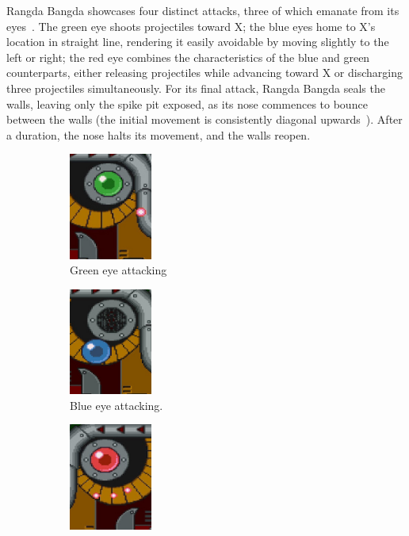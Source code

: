 Rangda Bangda showcases four distinct attacks, three of which emanate from its eyes~\cite{wiki:Rangda_bangda}. The green eye shoots projectiles toward X; the blue eyes home to X's location in straight line, rendering it easily avoidable by moving slightly to the left or right; the red eye combines the characteristics of the blue and green counterparts, either releasing projectiles while advancing toward X or discharging three projectiles simultaneously. For its final attack, Rangda Bangda seals the walls, leaving only the spike pit exposed, as its nose commences to bounce between the walls (the initial movement is consistently diagonal upwards~\cite{stratwiki:Sigma_stage_2}). After a duration, the nose halts its movement, and the walls reopen.

\begin{figure}[htp]
	\centering
	\begin{subfigure}[t]{0.30\linewidth}
		\centering
		\includegraphics[height=3.5cm]{figures/X1/Sigma_stages/Rangda_green.jpg}
		\caption{Green eye attacking}
	\end{subfigure}
	\begin{subfigure}[t]{0.30\linewidth}
		\centering
		\includegraphics[height=3.5cm]{figures/X1/Sigma_stages/Rangda_blue.jpg}
		\caption{Blue eye attacking.}
	\end{subfigure}
	\begin{subfigure}[t]{0.30\linewidth}
		\centering
		\includegraphics[height=3.5cm]{figures/X1/Sigma_stages/Rangda_red_1.jpg}

\end{subfigure}
\end{figure}
